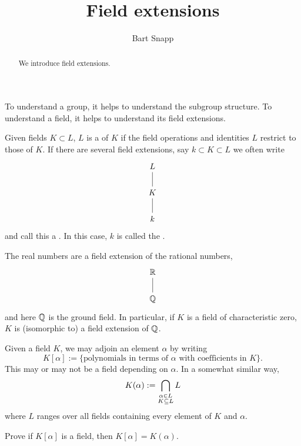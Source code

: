 \documentclass{ximera}
\author{Bart Snapp}
\title{Field extensions}
\begin{document}
\begin{abstract}
  We introduce field extensions.
\end{abstract}
\maketitle

To understand a group, it helps to understand the subgroup
structure. To understand a field, it helps to understand its field
extensions.


\begin{definition}
  Given fields $K\subset L$, $L$ is a  of $K$ if
  the field operations and identities $L$ restrict to those of $K$. If
  there are several field extensions, say $k \subset K \subset L$ we
  often write
  \[
  \begin{tikzcd}
    L\ar[d,-] \\
    K \ar[d,-]\\
    k
  \end{tikzcd}
  \]
  and call this a . In this case, $k$ is called the .
\end{definition}

\begin{example}
  The real numbers are a field extension of the rational numbers,
  \[
  \begin{tikzcd}
    \R\ar[d,-] \\
    \Q
  \end{tikzcd}
  \]
  and here $\mathbb Q$ is the ground field. In particular, if $K$ is a field
  of characteristic zero, $K$ is (isomorphic to) a field extension of $\mathbb Q$.
\end{example}



\begin{example}
  Given a field $K$, we may adjoin an element $\alpha$ by writing
  \[
  K[\alpha] :=\{\text{polynomials in terms of $\alpha$ with
    coefficients in $K$}\}.
  \]
  This may or may not be a field depending on $\alpha$. In a somewhat
  similar way,
  \[
  K(\alpha) := \bigcap_{\substack{\alpha \in L\\ K\subseteq L}} L\index{K(alpha)@$K(\alpha)$}
  \]
  where $L$ ranges over all fields containing every element of $K$ and $\alpha$.
\end{example}

\begin{exercise}
  Prove if $K[\alpha]$ is a field, then $K[\alpha] = K(\alpha)$.
\end{exercise}
\end{document}
